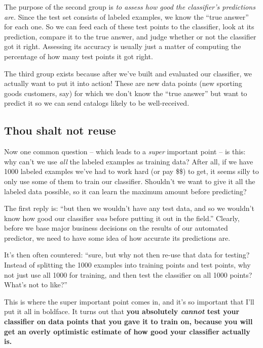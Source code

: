 The purpose of the second group is \textit{to assess how good the classifier's
predictions are.} Since the test set consists of labeled examples, we know the
``true answer'' for each one. So we can feed each of these test points to the
classifier, look at its prediction, compare it to the true answer, and judge
whether or not the classifier got it right. Assessing its accuracy is usually
just a matter of computing the percentage of how many test points it got right.

The third group exists because after we've built and evaluated our classifier,
we actually want to put it into action! These are new data points (new sporting
goods customers, say) for which we don't know the ``true answer'' but want to
predict it so we can send catalogs likely to be well-received.

\subsection{Thou shalt not reuse}

\label{cantTestOnTrainingData}

Now one common question -- which leads to a \textit{super} important point --
is this: why can't we use \textit{all} the labeled examples as training data?
After all, if we have 1000 labeled examples we've had to work hard (or pay
\$\$) to get, it seems silly to only use some of them to train our classifier.
Shouldn't we want to give it all the labeled data possible, so it can learn the
maximum amount before predicting?

The first reply is: ``but then we wouldn't have any test data, and so we
wouldn't know how good our classifier \textit{was} before putting it out in the
field.'' Clearly, before we base major business decisions on the results of our
automated predictor, we need to have some idea of how accurate its predictions
are.

It's then often countered: ``sure, but why not then re-use that data for
testing? Instead of splitting the 1000 examples into training points and test
points, why not just use all 1000 for training, and then test the classifier on
all 1000 points? What's not to like?''

This is where the super important point comes in, and it's so important that
I'll put it all in boldface. It turns out that \textbf{you absolutely
\textit{cannot} test your classifier on data points that you gave it to train
on, because you will get an overly optimistic estimate of how good your
classifier actually is.}

